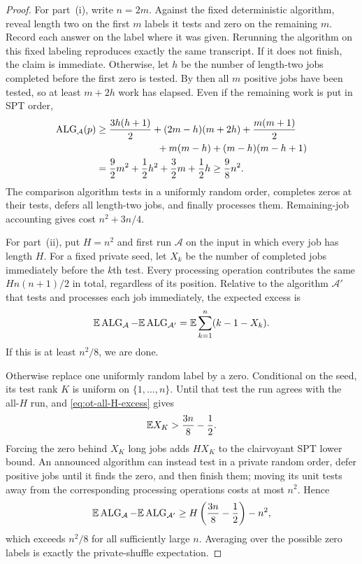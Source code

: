 \begin{proof}
For part~(i), write $n=2m$.  Against the fixed deterministic algorithm,
reveal length two on the first $m$ labels it tests and zero on the remaining
$m$.  Record each answer on the label where it was given.  Rerunning the
algorithm on this fixed labeling reproduces exactly the same transcript.
If it does not finish, the claim is immediate.  Otherwise, let $h$ be the
number of length-two jobs completed before the first zero is tested.  By
then all $m$ positive jobs have been tested, so at least $m+2h$ work has
elapsed.  Even if the remaining work is put in SPT order,
\begin{align*}
 \ALG_{\mathcal A}(p)
 &\ge \frac{3h(h+1)}2
 +(2m-h)(m+2h)+\frac{m(m+1)}2\\
 &\hspace{22mm}{}+m(m-h)+(m-h)(m-h+1)\\
 &=\frac92m^2+\frac12h^2+\frac32m+\frac12h
 \ge\frac98n^2.
\end{align*}
The comparison algorithm tests in a uniformly random order, completes zeros
at their tests, defers all length-two jobs, and finally processes them.
Remaining-job accounting gives cost $n^2+3n/4$.

For part~(ii), put $H=n^2$ and first run $\mathcal A$ on the input in which
every job has length $H$.  For a fixed private seed, let $X_k$ be the number
of completed jobs immediately before the $k$th test.  Every processing
operation contributes the same $Hn(n+1)/2$ in total, regardless of its
position.  Relative to the algorithm $\mathcal A'$ that tests and processes
each job immediately, the expected excess is
\begin{equation}
 \mathbb{E}\operatorname{ALG}_{\mathcal A}-\mathbb{E}\operatorname{ALG}_{\mathcal A'}
 =\mathbb{E}\sum_{k=1}^n(k-1-X_k).
 \label{eq:ot-all-H-excess}
\end{equation}
If this is at least $n^2/8$, we are done.

Otherwise replace one uniformly random label by a zero.  Conditional on the
seed, its test rank $K$ is uniform on $\{1,\ldots,n\}$.  Until that test the
run agrees with the all-$H$ run, and \cref{eq:ot-all-H-excess} gives
\begin{equation}
 \mathbb{E} X_K>\frac{3n}{8}-\frac12.
 \label{eq:ot-zero-rank-completions}
\end{equation}
Forcing the zero behind $X_K$ long jobs adds $HX_K$ to the clairvoyant SPT
lower bound.  An announced algorithm can instead test in a private random
order, defer positive jobs until it finds the zero, and then finish them;
moving its unit tests away from the corresponding processing operations
costs at most $n^2$.  Hence
\[
 \mathbb{E}\operatorname{ALG}_{\mathcal A}-\mathbb{E}\operatorname{ALG}_{\mathcal A'}
 \ge H\left(\frac{3n}{8}-\frac12\right)-n^2,
\]
which exceeds $n^2/8$ for all sufficiently large $n$.  Averaging over the
possible zero labels is exactly the private-shuffle expectation.
\end{proof}
